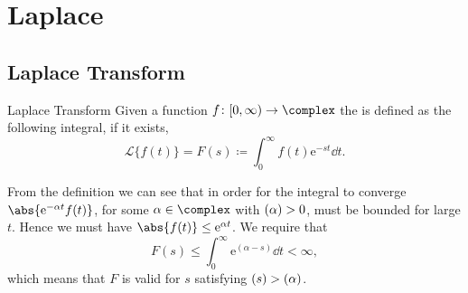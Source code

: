 \documentclass[fleqn]{NotesClass}
\newcommand*{\e}{\mathrm{e}}
\let\Re\relax
\DeclareMathOperator{\Re}{Re}
\newcommand*{\laplaceTransform}{\mathcal{L}}
\begin{document}
    \chapter{Laplace}
    \section{Laplace Transform}
    \begin{dfn}{Laplace Transform}{}
        Given a function \(f \colon [0, \infty) \to \complex\) the  is defined as the following integral, if it exists,
        \begin{equation}
            \laplaceTransform\{ f(t) \} = F(s) \coloneqq \int_{0}^{\infty} f(t)\e^{-st} \dd{t}.
        \end{equation}
    \end{dfn}
    
    From the definition we can see that in order for the integral to converge \(\abs{\e^{-\alpha t}f(t)}\), for some \(\alpha\in\complex\) with \(\Re(\alpha) > 0\), must be bounded for large \(t\).
    Hence we must have \(\abs{f(t)} \le \e^{\alpha t}\).
    We require that
    \begin{equation}
        F(s) \le \int_{0}^{\infty} \e^{(\alpha - s)} \dd{t} < \infty,
    \end{equation}
    which means that \(F\) is valid for \(s\) satisfying \(\Re(s) > \Re(\alpha)\).
    
\end{document}
